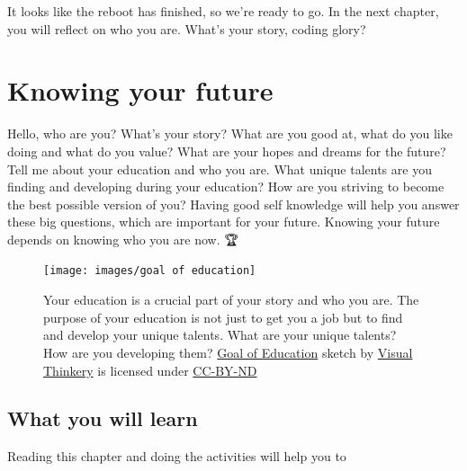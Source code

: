 \documentclass[
]{book}
\begin{document}
It looks like the reboot has finished, so we're ready to go. In the next chapter, you will reflect on who you are. What's your story, coding glory?

\hypertarget{knowing}{%
\chapter{Knowing your future}\label{knowing}}

Hello, who are you? What's your story? What are you good at, what do you like doing and what do you value? What are your hopes and dreams for the future? Tell me about your education and who you are. What unique talents are you finding and developing during your education? How are you striving to become the best possible version of you? Having good self knowledge will help you answer these big questions, which are important for your future. Knowing your future depends on knowing who you are now. 🏆

\begin{figure}

{\centering \texttt{[image: images/goal of education]} 

}

\caption{Your education is a crucial part of your story and who you are. The purpose of your education is not just to get you a job but to find and develop your unique talents. What are your unique talents? How are you developing them? \href{https://www.flickr.com/photos/122135325@N06/16627558943/}{Goal of Education} sketch by \href{https://visualthinkery.com/}{Visual Thinkery} is licensed under \href{https://creativecommons.org/licenses/by-nd/4.0/}{CC-BY-ND}}\label{fig:goal-fig}
\end{figure}



\hypertarget{ilo2}{%
\section{What you will learn}\label{ilo2}}

Reading this chapter and doing the activities will help you to
\end{document}
